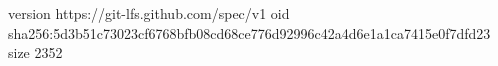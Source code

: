 version https://git-lfs.github.com/spec/v1
oid sha256:5d3b51c73023cf6768bfb08cd68ce776d92996c42a4d6e1a1ca7415e0f7dfd23
size 2352
